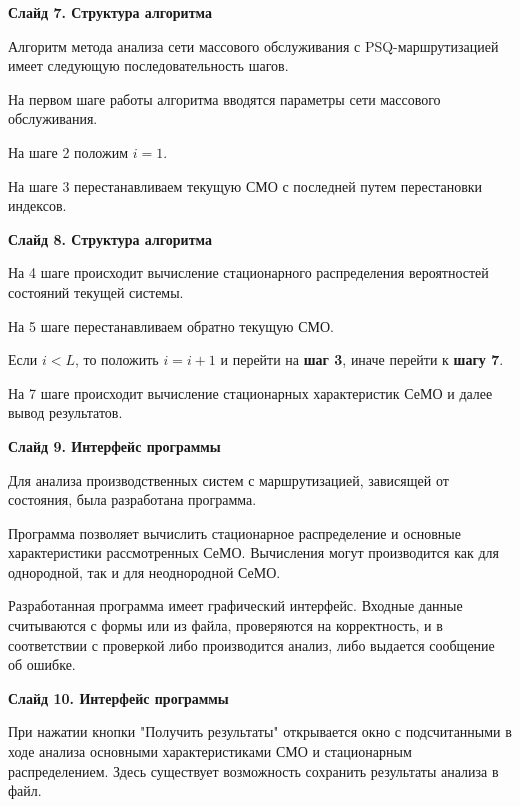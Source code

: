 \documentclass[a4paper,14pt]{extarticle}
\theoremstyle{note}
\begin{document}

\textbf{Слайд 7. Структура алгоритма}

Алгоритм метода анализа сети массового обслуживания с PSQ-маршрутизацией имеет следующую последовательность шагов.

На первом шаге работы алгоритма вводятся параметры сети массового обслуживания.

На шаге 2 положим $i = 1$.

На шаге 3 перестанавливаем текущую СМО с последней путем перестановки индексов.


\textbf{Слайд 8. Структура алгоритма}

На 4 шаге происходит вычисление стационарного распределения вероятностей состояний текущей системы.

На 5 шаге перестанавливаем обратно текущую СМО.

Если $i < L$, то положить $i=i+1$ и перейти на \textbf{шаг 3}, иначе перейти к \textbf{шагу 7}.

На 7 шаге происходит вычисление стационарных характеристик СеМО и далее вывод результатов.


\textbf{Слайд 9. Интерфейс программы}

Для анализа производственных систем с маршрутизацией, зависящей от состояния, была разработана программа.

Программа позволяет вычислить стационарное распределение и основные характеристики рассмотренных СеМО. Вычисления могут производится как для однородной, так и для неоднородной СеМО.

Разработанная программа имеет графический интерфейс. Входные данные считываются с формы или из файла, проверяются на корректность, и в соответствии с проверкой либо производится анализ, либо выдается сообщение об ошибке.


\textbf{Слайд 10. Интерфейс программы}

При нажатии кнопки "Получить результаты" открывается окно с подсчитанными в ходе анализа основными характеристиками СМО и стационарным распределением. Здесь существует возможность сохранить результаты анализа в файл.
\end{document}
